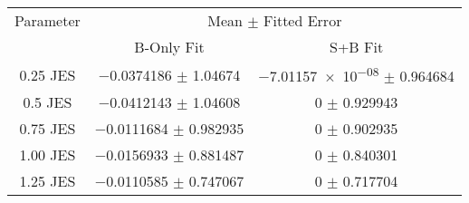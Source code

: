 \begin{scriptsize}
\begin{table}
\centering
\begin{tabular}{ccc}
\toprule
Parameter & \multicolumn{2}{c}{{Mean $\pm$ Fitted Error}}\\
 & {B-Only Fit} & {S+B Fit}\\
\midrule
\num[round-precision=2]{0.25} JES & \num{-0.0374186} $\pm$ \num{1.04674} & \num{-7.01157e-08} $\pm$ \num{0.964684}\\
\num[round-precision=2]{0.5} JES & \num{-0.0412143} $\pm$ \num{1.04608} & \num{0} $\pm$ \num{0.929943}\\
\num[round-precision=2]{0.75} JES & \num{-0.0111684} $\pm$ \num{0.982935} & \num{0} $\pm$ \num{0.902935}\\
\num[round-precision=2]{1.00} JES & \num{-0.0156933} $\pm$ \num{0.881487} & \num{0} $\pm$ \num{0.840301}\\
\num[round-precision=2]{1.25} JES & \num{-0.0110585} $\pm$ \num{0.747067} & \num{0} $\pm$ \num{0.717704}\\
\bottomrule
\end{tabular}
\end{table}
\end{scriptsize}
